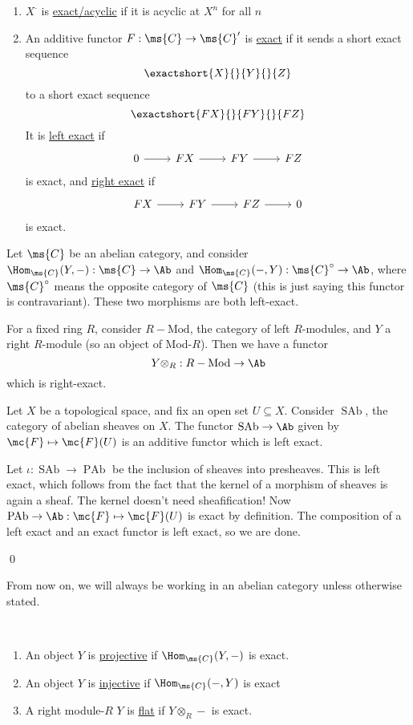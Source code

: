 \documentclass[x11names,reqno,14pt]{extarticle}
\newcommand{\RMod}{R-\text{Mod}}
\DeclareMathOperator{\SAb}{SAb}
\DeclareMathOperator{\PAb}{PAb}
\begin{document}
\begin{enumerate}[label=(\alph*)]
\item $X^\cdot$ is \underline{exact/acyclic} if it is acyclic at $X^n$ for all $n$

\item An additive functor $F:\ms{C}\to\ms{C}'$ is \underline{exact} if it sends a short exact sequence 
\[
\exactshort{X}{}{Y}{}{Z}
\]
to a short exact sequence
\[
\exactshort{FX}{}{FY}{}{FZ}
\]
It is \underline{left exact} if
\[
\begin{tikzcd}
0 \ar[r] & FX \ar[r] & FY \ar[r] & FZ
\end{tikzcd}
\]
is exact, and \underline{right exact} if
\[
\begin{tikzcd}
FX \ar[r] & FY \ar[r] & FZ \ar[r] & 0 
\end{tikzcd}
\]
is exact.

\end{enumerate}

\exm

Let $\ms{C}$ be an abelian category, and consider $\Hom_{\ms{C}}(Y,-):\ms{C}\to\Ab$ and $\Hom_{\ms{C}}(-,Y): \ms{C}^\circ\to\Ab$, where $\ms{C}^\circ$ means the opposite category of $\ms{C}$ (this is just saying this functor is contravariant). These two morphisms are both left-exact.

\exm

For a fixed ring $R$, consider $\RMod$, the category of left $R$-modules, and $Y$ a right $R$-module (so an object of Mod-$R$). Then we have a functor
\[
Y\otimes_{R}:\RMod\to\Ab
\]
which is right-exact.

\prop

Let $X$ be a topological space, and fix an open set $U \subseteq X$. Consider $\SAb$, the category of abelian sheaves on $X$. The functor $\SAb\to \Ab$ given by $\mc{F}\mapsto\mc{F}(U)$ is an additive functor which is left exact.

\proof

Let $\iota:\SAb\to\PAb$ be the inclusion of sheaves into presheaves. This is left exact, which follows from the fact that the kernel of a morphism of sheaves is again a sheaf. The kernel doesn't need sheafification! Now $\PAb\to\Ab: \mc{F}\mapsto\mc{F}(U)$ is exact by definition. The composition of a left exact and an exact functor is left exact, so we are done. 

\qed

From now on, we will always be working in an abelian category unless otherwise stated.

\,

\begin{enumerate}[label=(\alph*)]

\item An object $Y$ is \underline{projective} if $\Hom_{\ms{C}}(Y,-)$ is exact.

\item An object $Y$ is \underline{injective} if $\Hom_{\ms{C}}(-,Y)$ is exact

\item A right module-$R$ $Y$ is \underline{flat} if $Y\otimes_R-$ is exact.

\end{enumerate}
\end{document}
